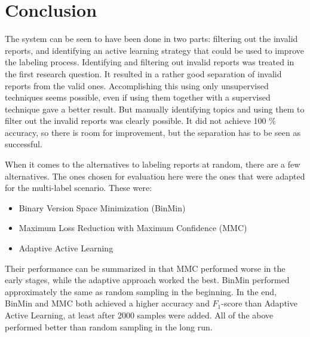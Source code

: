 
\chapter{Conclusion}
\label{cha:conclusion}

The system can be seen to have been done in two parts: filtering out the invalid reports, and identifying an active learning strategy that could be used to improve the labeling process.
Identifying and filtering out invalid reports was treated in the first research question.
It resulted in a rather good separation of invalid reports from the valid ones.
Accomplishing this using only unsupervised techniques seems possible, even if using them together with a supervised technique gave a better result.
But manually identifying topics and using them to filter out the invalid reports was clearly possible.
It did not achieve 100 \% accuracy, so there is room for improvement, but the separation has to be seen as successful.

When it comes to the alternatives to labeling reports at random, there are a few alternatives.
The ones chosen for evaluation here were the ones that were adapted for the multi-label scenario.
These were: 
\begin{itemize}
    \item Binary Version Space Minimization (BinMin)
    \item Maximum Loss Reduction with Maximum Confidence (MMC)
    \item Adaptive Active Learning 
\end{itemize}
Their performance can be summarized in that MMC performed worse in the early stages, while the adaptive approach worked the best.
BinMin performed approximately the same as random sampling in the beginning.
In the end, BinMin and MMC both achieved a higher accuracy and $F_1$-score than Adaptive Active Learning, at least after 2000 samples were added.
All of the above performed better than random sampling in the long run.

